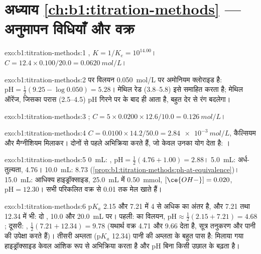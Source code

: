 \section*{अध्याय \ref{ch:b1:titration-methods} --- अनुमापन विधियाँ और वक्र}

\begin{solution}{exo:b1:titration-methods:1}
, $K = 1/K_e = 10^{14.00}$। $C = 12.4 \times
0.100/20.0 = \qty{0.0620}{mol/L}$।
\end{solution}

\begin{solution}{exo:b1:titration-methods:2}
 पर विलयन \qty{0.050}{mol/L} पर अमोनियम क्लोराइड है:
$\mathrm{pH} = \frac12(9.25 - \log 0.050) = 5.28$।
मेथिल रेड (3.8--5.8) इसे समाहित करता है; मेथिल ऑरेंज, जिसका परास (2.5--4.5) pH गिरने पर  के बाद ही आता है, बहुत देर से रंग बदलेगा।
\end{solution}

\begin{solution}{exo:b1:titration-methods:3}
;
$C = 5 \times 0.0200 \times 12.6/10.0 = \qty{0.126}{mol/L}$।
\end{solution}

\begin{solution}{exo:b1:titration-methods:4}
$C = 0.0100 \times 14.2/50.0 = \qty{2.84e-3}{mol/L}$, कैल्सियम और
मैग्नीशियम मिलाकर। दोनों  से पहले अभिक्रिया करते हैं, जो केवल उनका योग देता है:
।
\end{solution}

\begin{solution}{exo:b1:titration-methods:5}
0~mL: , $\mathrm{pH} = \frac12(4.76 + 1.00) = 2.88$। 5.0~mL:
अर्ध-तुल्यता, 4.76। 10.0~mL: 8.73
(\cref{prop:b1:titration-methods:ph-at-equivalence})। 15.0~mL: आधिक्य
हाइड्रॉक्साइड, \qty{25.0}{mL} में \qty{0.50}{mmol}, $[\ce{OH-}] = 0.020$,
$\mathrm{pH} = 12.30$। सभी परिकलित वक्र से 0.01 तक मेल खाते हैं।
\end{solution}

\begin{solution}{exo:b1:titration-methods:6}
$\mathrm{p}K_a$ 2.15 और 7.21 में 4 से अधिक का अंतर है, और 7.21 तथा
12.34 में भी: दो , 10.0 और \qty{20.0}{mL} पर। पहली:  का
विलयन, $\mathrm{pH} \approx \frac12(2.15 + 7.21) = 4.68$; दूसरी:
, $\frac12(7.21 + 12.34) = 9.78$ (यथार्थ वक्र 4.71 और
9.66 देता है, सूत्र तनुकरण और पानी की उपेक्षा करते हैं)। तीसरी अम्लता
($\mathrm{p}K_a$ 12.34) पानी की अम्लता के बहुत पास है: मिलाया गया हाइड्रॉक्साइड
केवल आंशिक रूप से अभिक्रिया करता है और pH बिना किसी उछाल के बढ़ता है।
\end{solution}

